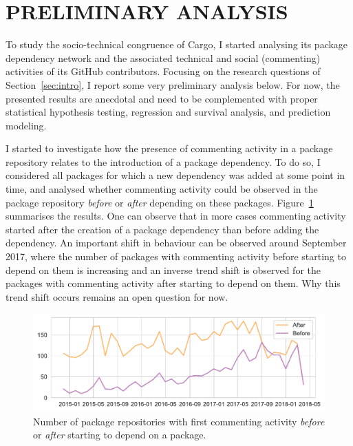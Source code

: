 \section{PRELIMINARY ANALYSIS}

To study the socio-technical congruence of Cargo, I started analysing its package dependency network and the associated technical and social (commenting) activities of its GitHub contributors.
Focusing on the research questions of Section~\ref{sec:intro}, I report some very preliminary analysis below.
For now, the presented results are anecdotal and need to be complemented with proper statistical hypothesis testing, regression and survival analysis, and prediction modeling.

I started to investigate how the presence of commenting activity in a package repository relates to the introduction of a package dependency.
To do so, I considered all packages for which a new dependency was added at some point in time, and analysed whether commenting activity could be observed in the package repository \emph{before} or \emph{after} depending on these packages. Figure~\ref{fig:fig1} summarises the results. One can observe that in more cases commenting activity started after the creation of a package dependency than before adding the dependency. 
An important shift in behaviour can be observed around September 2017, where the number of packages with commenting activity before starting to depend on them is increasing and an inverse trend shift is observed for the packages with commenting activity  after starting to depend on them. Why this trend shift occurs remains an open question for now.

\begin{figure}[thb]
    \includegraphics[width=\columnwidth]{Photos/RQ21.pdf} 
    \caption{Number of package repositories with first commenting activity \emph{before} or \emph{after} starting to depend on a package.}
    \label{fig:fig1}
\end{figure}

